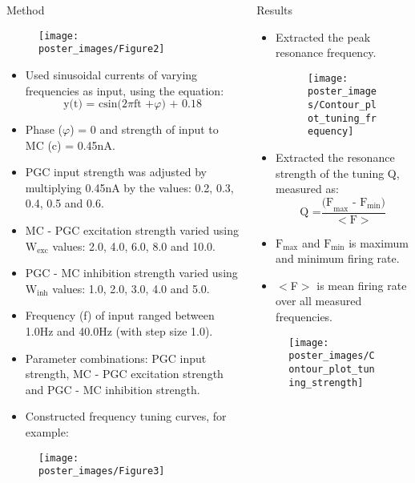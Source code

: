 \documentclass[final,hyperref={pdfpagelabels=false}]{beamer}
\begin{document}
\begin{frame}{}
\begin{columns}[t]
\begin{column}{.48\linewidth}
\begin{block}{Method} 
\begin{figure}
\center
\texttt{[image: poster\_images/Figure2]}
\end{figure}
\begin{itemize}
\item Used sinusoidal currents of varying frequencies as input, using the equation:
\[
\text{y(t) = csin(2} \pi \text{ft +} \varphi\text{) + 0.18}
\]
\item Phase ($\varphi$) = 0 and strength of input to MC (c) = 0.45nA.
\item PGC input strength was adjusted by multiplying 0.45nA by the values: 0.2, 0.3, 0.4, 0.5 and 0.6.
\item MC - PGC excitation strength varied using \mbox{$\text{W}_{\text{exc}}$} values: 2.0, 4.0, 6.0, 8.0 and 10.0.
\item PGC - MC inhibition strength varied using  \mbox{$\text{W}_{\text{inh}}$} values: 1.0, 2.0, 3.0, 4.0 and 5.0.
\item Frequency (f) of input ranged between 1.0Hz and 40.0Hz (with step size 1.0).
\item Parameter combinations: PGC input strength, MC - PGC excitation strength and PGC - MC inhibition strength.
\item Constructed frequency tuning curves, for example:
\end{itemize}
\begin{figure}
\center
\texttt{[image: poster\_images/Figure3]}
\end{figure}
\end{block}

\end{column}
\begin{column}{.48\linewidth}

\begin{block}{Results}
\begin{itemize}
\item Extracted the peak resonance frequency.
\begin{figure}
\center
\texttt{[image: poster\_images/Contour\_plot\_tuning\_frequency]}
\end{figure}
\item Extracted the resonance strength of the tuning Q, measured as:
\[
\text{Q =} \frac{\text{(F}_{\text{max}} \text{ - F}_{\text{min}}\text{)}}{<\text{F}>}
\]
\item \mbox{$\text{F}_{\text{max}}$} and \mbox{$\text{F}_{\text{min}}$} is maximum and minimum firing rate.
\item $<$F$>$ is mean firing rate over all measured frequencies.
\end{itemize}
\begin{figure}
\center
\texttt{[image: poster\_images/Contour\_plot\_tuning\_strength]}
\end{figure} 
\end{block}


\end{column}
\end{columns}
\end{frame}
\end{document}
